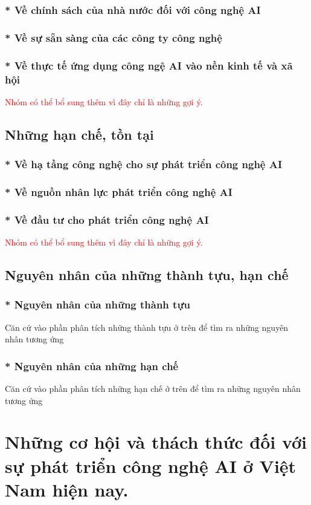 \documentclass{report}
\begin{document}
\subsubsection{* Về chính sách của nhà nước đối với công nghệ  AI}
\subsubsection{* Về sự sẵn sàng của các công ty công nghệ}
\subsubsection{* Về thực tế ứng dụng công ngệ AI vào nền kinh tế và xã hội} 
\textcolor{red}{Nhóm có thể bổ sung thêm vì đây chỉ là những gợi ý.}

\subsection{Những hạn chế, tồn tại }
\subsubsection{* Về hạ tầng công nghệ cho sự phát triển công nghệ AI}
\subsubsection{* Về nguồn nhân lực phát triển công nghệ AI}
\subsubsection{* Về đầu tư cho phát triển công nghệ AI}
\textcolor{red}{Nhóm có thể bổ sung thêm vì đây chỉ là những gợi ý.}
\subsection{Nguyên nhân của những thành tựu, hạn chế }
\subsubsection{* Nguyên nhân của những thành tựu}
Căn cứ vào phần phân tích những thành tựu ở trên để tìm ra những nguyên nhân tương ứng
\subsubsection{* Nguyên nhân của những hạn chế}
Căn cứ vào phần phân tích những hạn chế ở trên để tìm ra những nguyên nhân tương ứng
\section{Những cơ hội và thách thức đối với sự phát triển công nghệ AI ở Việt Nam hiện nay.}
\end{document}
